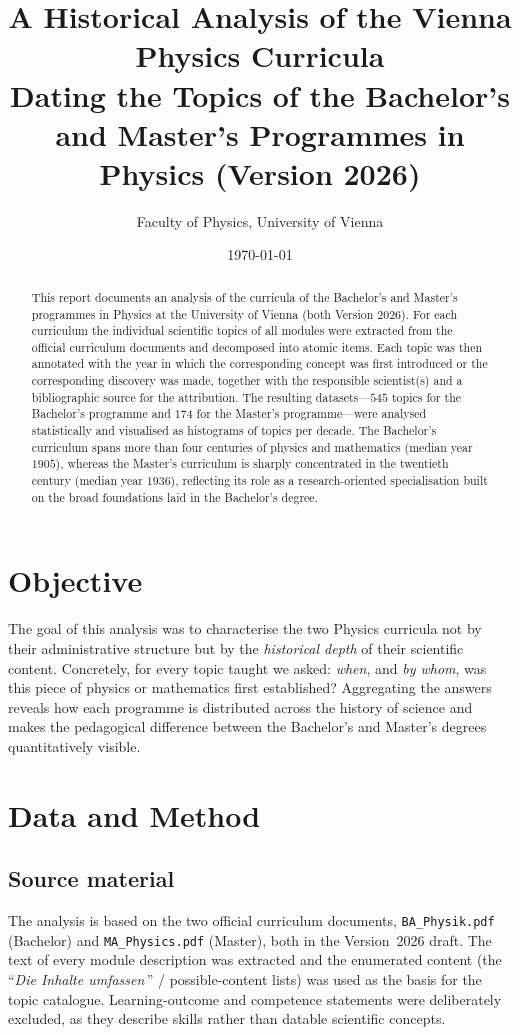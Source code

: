 \documentclass[11pt,a4paper]{article}
\title{\textbf{A Historical Analysis of the Vienna Physics Curricula}\\[2mm]
\large Dating the Topics of the Bachelor's and Master's Programmes in Physics
(Version 2026)}
\author{Faculty of Physics, University of Vienna}
\date{\today}
\begin{document}
\maketitle

\begin{abstract}
\noindent
This report documents an analysis of the curricula of the Bachelor's and
Master's programmes in Physics at the University of Vienna (both Version 2026).
For each curriculum the individual scientific topics of all modules were
extracted from the official curriculum documents and decomposed into atomic
items. Each topic was then annotated with the year in which the corresponding
concept was first introduced or the corresponding discovery was made, together
with the responsible scientist(s) and a bibliographic source for the
attribution. The resulting datasets---$545$ topics for the Bachelor's programme
and $174$ for the Master's programme---were analysed statistically and
visualised as histograms of topics per decade. The Bachelor's curriculum spans
more than four centuries of physics and mathematics (median year $1905$),
whereas the Master's curriculum is sharply concentrated in the twentieth
century (median year $1936$), reflecting its role as a research-oriented
specialisation built on the broad foundations laid in the Bachelor's degree.
\end{abstract}

\section{Objective}
The goal of this analysis was to characterise the two Physics curricula not by
their administrative structure but by the \emph{historical depth} of their
scientific content. Concretely, for every topic taught we asked: \emph{when},
and \emph{by whom}, was this piece of physics or mathematics first established?
Aggregating the answers reveals how each programme is distributed across the
history of science and makes the pedagogical difference between the Bachelor's
and Master's degrees quantitatively visible.

\section{Data and Method}

\subsection{Source material}
The analysis is based on the two official curriculum documents,
\texttt{BA\_Physik.pdf} (Bachelor) and \texttt{MA\_Physics.pdf} (Master), both in
the Version~2026 draft. The text of every module description was extracted and
the enumerated content (the ``\textit{Die Inhalte umfassen}\,'' / possible-content
lists) was used as the basis for the topic catalogue. Learning-outcome and
competence statements were deliberately excluded, as they describe skills rather
than datable scientific concepts.
\end{document}
